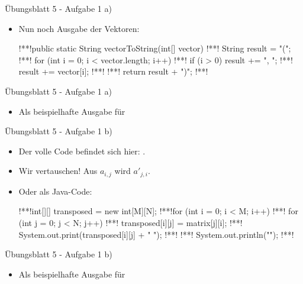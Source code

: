 \begin{frame}[t,fragile]{Übungsblatt 5 - Aufgabe 1 a)}
    \begin{itemize}[<+(1)->]
        \item Nun noch Ausgabe der Vektoren:
\begin{plainjava}
!**!public static String vectorToString(int[] vector) {
!**!    String result = "(";
!**!    for (int i = 0; i < vector.length; i++) {
!**!        if (i > 0) result += ", ";
!**!        result += vector[i];
!**!    }
!**!    return result + ")";
!**!}
\end{plainjava}
    \end{itemize}
\end{frame}

\iffull
{}
\begin{frame}[t,fragile]{Übungsblatt 5 - Aufgabe 1 a)}
    \begin{itemize}[<+(1)->]
        \item Als beispielhafte Ausgabe für 
    \end{itemize}
\end{frame}
\fi

\begin{frame}[t,fragile]{Übungsblatt 5 - Aufgabe 1 b)}
    \begin{itemize}[<+(1)->]
        \item Der volle Code befindet sich hier: .
        \item Wir vertauschen! Aus \(a_{i, j}\) wird \(a'_{j, i}\).
        \item Oder als Java-Code:
\begin{plainjava}
!**!int[][] transposed = new int[M][N];
!**!for (int i = 0; i < M; i++) {
!**!    for (int j = 0; j < N; j++) {
!**!        transposed[i][j] = matrix[j][i];
!**!        System.out.print(transposed[i][j] + " ");
!**!    }
!**!    System.out.println("");
!**!}
\end{plainjava}
    \end{itemize}
\end{frame}

\iffull
{}
\begin{frame}[t,fragile]{Übungsblatt 5 - Aufgabe 1 b)}
    \def\rbashcurrentinject{multicols=2}%
    \begin{itemize}[<+(1)->]
        \item {}Als beispielhafte Ausgabe für 
    \end{itemize}
\end{frame}
\fi

